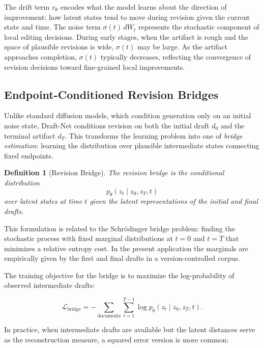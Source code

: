 \documentclass[12pt,a4paper]{article}
\theoremstyle{draftthm}
\newtheorem{definition}{Definition}[section]
\newcommand{\vtheta}{v_{\theta}}
\newcommand{\ptheta}{p_{\theta}}
\newcommand{\bW}{W}
\begin{document}
The drift term $\vtheta$ encodes what the model learns about the direction of improvement: how latent states tend to move during revision given the current state and time. The noise term $\sigma(t)\, d\bW_t$ represents the stochastic component of local editing decisions. During early stages, when the artifact is rough and the space of plausible revisions is wide, $\sigma(t)$ may be large. As the artifact approaches completion, $\sigma(t)$ typically decreases, reflecting the convergence of revision decisions toward fine-grained local improvements.

\subsection{Endpoint-Conditioned Revision Bridges}

Unlike standard diffusion models, which condition generation only on an initial noise state, Draft-Net conditions revision on both the initial draft $d_0$ and the terminal artifact $d_T$. This transforms the learning problem into one of \emph{bridge estimation}: learning the distribution over plausible intermediate states connecting fixed endpoints.

\begin{definition}[Revision Bridge]
  The \emph{revision bridge} is the conditional distribution
  \begin{equation}
    \ptheta(z_t \mid z_0, z_T, t)
  \end{equation}
  over latent states at time $t$ given the latent representations of the initial and final drafts.
\end{definition}

This formulation is related to the Schrödinger bridge problem: finding the stochastic process with fixed marginal distributions at $t=0$ and $t=T$ that minimizes a relative entropy cost. In the present application the marginals are empirically given by the first and final drafts in a version-controlled corpus.

The training objective for the bridge is to maximize the log-probability of observed intermediate drafts:

\begin{equation}
  \mathcal{L}_{\mathrm{bridge}}
  =
  - \sum_{\text{documents}}
  \sum_{t=1}^{T-1}
  \log \ptheta(z_t \mid z_0, z_T, t).
  \label{eq:bridge-loss}
\end{equation}

In practice, when intermediate drafts are available but the latent distances serve as the reconstruction measure, a squared error version is more common:
\end{document}
